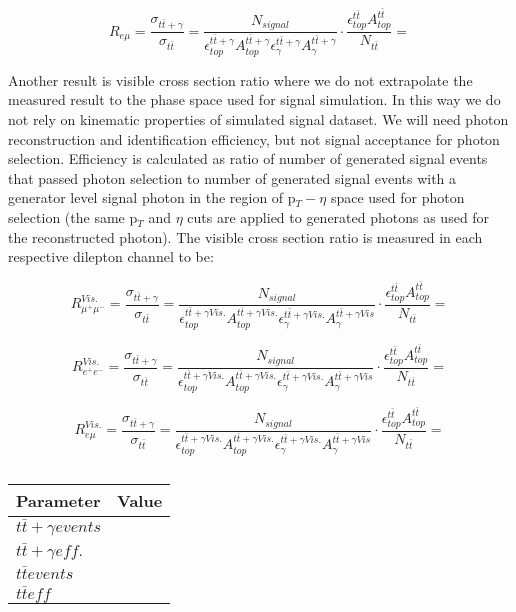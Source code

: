 \begin{equation}
	R_{e\mu} = \frac{\sigma_{t\bar{t}+\gamma}}{\sigma_{t\bar{t}}} = \frac{N_{signal}}{\epsilon^{t\bar{t}+\gamma}_{top} A^{t\bar{t}+\gamma}_{top} \epsilon^{t\bar{t}+\gamma}_{\gamma} A^{t\bar{t}+\gamma}_{\gamma}} \cdot \frac{\epsilon^{t\bar{t}}_{top} A^{t\bar{t}}_{top}}{N_{t\bar{t}}} = 
\end{equation}

Another result is visible cross section ratio where we do not extrapolate the measured result to the phase space used for signal simulation. In this way we do not rely on kinematic properties of simulated signal dataset. We will need photon reconstruction and identification efficiency, but not signal acceptance for photon selection. Efficiency is calculated as ratio of number of generated signal events that passed photon selection to number of generated signal events with a generator level signal photon in the region of p$_T - \eta$ space used for photon selection (the same p$_T$ and $\eta$ cuts are applied to generated photons as used for the reconstructed photon). The visible cross section ratio is measured in each respective dilepton channel to be:

\begin{equation}
	R^{Vis.}_{\mu^+\mu^-} = \frac{\sigma_{t\bar{t}+\gamma}}{\sigma_{t\bar{t}}} = \frac{N_{signal}}{\epsilon^{t\bar{t}+\gamma Vis.}_{top} A^{t\bar{t}+\gamma Vis.}_{top} \epsilon^{t\bar{t}+\gamma Vis.}_{\gamma} A^{t\bar{t}+\gamma Vis}_{\gamma}} \cdot \frac{\epsilon^{t\bar{t}}_{top} A^{t\bar{t}}_{top}}{N_{t\bar{t}}} = 
\end{equation}

\begin{equation}
	R^{Vis.}_{e^+e^-} = \frac{\sigma_{t\bar{t}+\gamma}}{\sigma_{t\bar{t}}} = \frac{N_{signal}}{\epsilon^{t\bar{t}+\gamma Vis.}_{top} A^{t\bar{t}+\gamma Vis.}_{top} \epsilon^{t\bar{t}+\gamma Vis.}_{\gamma} A^{t\bar{t}+\gamma Vis}_{\gamma}} \cdot \frac{\epsilon^{t\bar{t}}_{top} A^{t\bar{t}}_{top}}{N_{t\bar{t}}} = 
\end{equation}

\begin{equation}
	R^{Vis.}_{e\mu} = \frac{\sigma_{t\bar{t}+\gamma}}{\sigma_{t\bar{t}}} = \frac{N_{signal}}{\epsilon^{t\bar{t}+\gamma Vis.}_{top} A^{t\bar{t}+\gamma Vis.}_{top} \epsilon^{t\bar{t}+\gamma Vis.}_{\gamma} A^{t\bar{t}+\gamma Vis}_{\gamma}} \cdot \frac{\epsilon^{t\bar{t}}_{top} A^{t\bar{t}}_{top}}{N_{t\bar{t}}} = 
\end{equation}

\begin{table}
\centering
\begin{tabular}{|l|l|}
\hline
	\textbf{Parameter} & \textbf{Value} \\
\hline
	$t\bar{t}+\gamma events$ & \\
	$t\bar{t}+\gamma eff.$ & \\
	$t\bar{t} events$ & \\
	$t\bar{t} eff$ & \\
\hline
\end{tabular}
\caption{}
\end{table}	